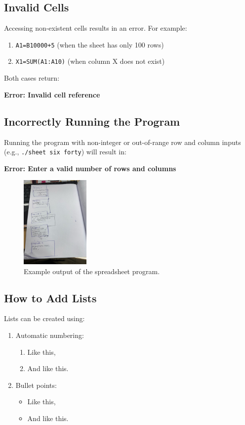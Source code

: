 \documentclass[a4paper]{article}
\begin{document}
\subsection{Invalid Cells}
Accessing non-existent cells results in an error. For example:
\begin{enumerate}
    \item \texttt{A1=B10000+5} (when the sheet has only 100 rows)
    \item \texttt{X1=SUM(A1:A10)} (when column X does not exist)
\end{enumerate}
Both cases return:
\begin{center}
    \textbf{Error: Invalid cell reference}
\end{center}

\subsection{Incorrectly Running the Program}
Running the program with non-integer or out-of-range row and column inputs (e.g., \texttt{./sheet six forty}) will result in:
\begin{center}
    \textbf{Error: Enter a valid number of rows and columns}
\end{center}

\begin{figure}
\centering
\includegraphics[width=0.3\textwidth]{copass.jpg}
\caption{Example output of the spreadsheet program.}
\end{figure}

\subsection{How to Add Lists}
Lists can be created using:
\begin{enumerate}
    \item Automatic numbering:
    \begin{enumerate}
        \item Like this,
        \item And like this.
    \end{enumerate}
    \item Bullet points:
    \begin{itemize}
        \item Like this,
        \item And like this.
    \end{itemize}
\end{enumerate}
\end{document}
